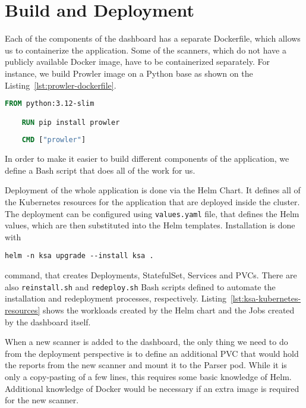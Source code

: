 \section{Build and Deployment}
\label{sec:build-and-deployment}

Each of the components of the dashboard has a separate Dockerfile, which allows us to containerize the application. Some of the scanners, which do not have a publicly available Docker image, have to be containerized separately. For instance, we build Prowler image on a Python base as shown on the Listing~\ref{lst:prowler-dockerfile}.

\begin{lstlisting}[language=Dockerfile, caption={[Dockerfile definition of Prowler image] Dockerfile definition of Prowler image.}, label={lst:prowler-dockerfile}]
    FROM python:3.12-slim

    RUN pip install prowler
    
    CMD ["prowler"]    
\end{lstlisting}

In order to make it easier to build different components of the application, we define a Bash script that does all of the work for us.

Deployment of the whole application is done via the Helm Chart. It defines all of the Kubernetes resources for the application that are deployed inside the cluster. The deployment can be configured using \lstinline{values.yaml} file, that defines the Helm values, which are then substituted into the Helm templates. Installation is done with 
\begin{center}
    \lstinline{helm -n ksa upgrade --install ksa .}
\end{center} 
command, that creates Deployments, StatefulSet, Services and PVCs. There are also \lstinline{reinstall.sh} and \lstinline{redeploy.sh} Bash scripts defined to automate the installation and redeployment processes, respectively. Listing~\ref{lst:ksa-kubernetes-resources} shows the workloads created by the Helm chart and the Jobs created by the dashboard itself.

When a new scanner is added to the dashboard, the only thing we need to do from the deployment perspective is to define an additional PVC that would hold the reports from the new scanner and mount it to the Parser pod. While it is only a copy-pasting of a few lines, this requires some basic knowledge of Helm. Additional knowledge of Docker would be necessary if an extra image is required for the new scanner.

